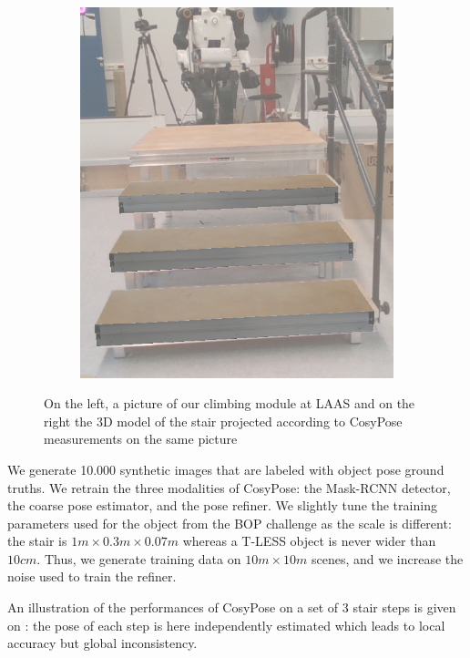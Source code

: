\begin{figure}[h]
\begin{subfigure}[]{{.33\linewidth}}
        \includegraphics[width=\textwidth]{figures/cosyslam/0006_proj.png} 
    \end{subfigure}
    \caption{On the left, a picture of our climbing module at LAAS and on the right the 3D model of the stair projected according to CosyPose measurements on the same picture}%
    \label{fig:cosypose-ycbv}%
\end{figure}

We generate 10.000 synthetic images that are labeled with object pose ground truths. We retrain the three modalities of CosyPose: 
the Mask-RCNN detector, the coarse pose estimator, and the pose refiner. We slightly tune the training parameters used for the object from the BOP challenge as 
the scale is different: the stair is $1m \times 0.3m \times 0.07m$ whereas a T-LESS object is never wider than $10cm$. 
Thus, we generate training data on $10m \times 10m$ scenes, and we increase the noise used to train the refiner.  

An illustration of the performances of CosyPose on a set of 3 stair steps is given on : 
the pose of each step is here independently estimated which leads to local accuracy but global inconsistency. 